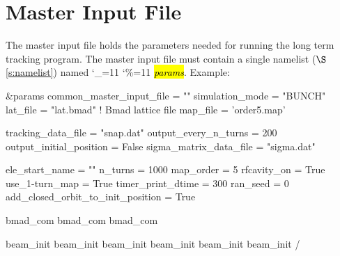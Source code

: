 \documentclass{hitec}
\newcommand\dottcmd[1]{\hl{\em#1}\endgroup}
\newcommand{\vn}{\begingroup\catcode`\_=11 \catcode`\%=11 \dottcmd}
\newcommand{\sref}[1]{$\S$\ref{#1}}
\newcommand{\Section}[1]{\section{#1}\vspace*{-1ex}}
\begin{document}
{{{{{{%
\Section{Master Input File}
\label{s:input}

The master input file holds the parameters needed for running the long term tracking program. The
master input file must contain a single namelist (\sref{s:namelist}) named \vn{params}.  Example:
\begin{code}
&params
  common_master_input_file = ""
  simulation_mode = "BUNCH"
  lat_file   =  "lat.bmad"     ! Bmad lattice file
  map_file = 'order5.map'

  tracking_data_file  = "snap.dat"
  output_every_n_turns = 200
  output_initial_position = False
  sigma_matrix_data_file = "sigma.dat"

  ele_start_name     = ""
  n_turns            = 1000
  map_order          = 5
  rfcavity_on        = True
  use_1-turn_map     = True
  timer_print_dtime  = 300
  ran_seed           = 0
  add_closed_orbit_to_init_position = True

  bmad_com%
  bmad_com%
  bmad_com%

  beam_init%
  beam_init%
  beam_init%
  beam_init%
  beam_init%
  beam_init%
/
\end{code}

}}}}}}
\end{document}
